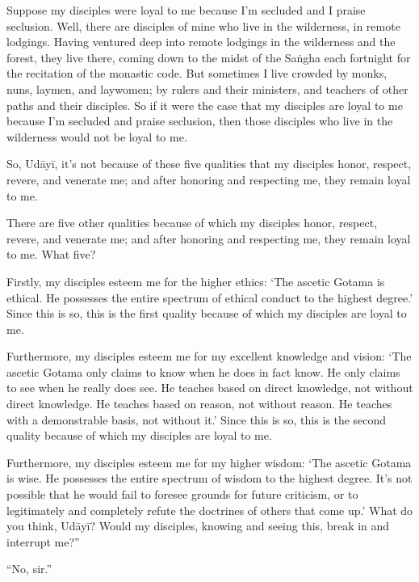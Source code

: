 \documentclass[12pt,openany]{book}%
\begin{document}
Suppose my disciples were loyal to me because I’m secluded and I praise seclusion. Well, there are disciples of mine who live in the wilderness, in remote lodgings. Having ventured deep into remote lodgings in the wilderness and the forest, they live there, coming down to the midst of the \textsanskrit{Saṅgha} each fortnight for the recitation of the monastic code. But sometimes I live crowded by monks, nuns, laymen, and laywomen; by rulers and their ministers, and teachers of other paths and their disciples. So if it were the case that my disciples are loyal to me because I’m secluded and praise seclusion, then those disciples who live in the wilderness would not be loyal to me. 

So, \textsanskrit{Udāyī}, it’s not because of these five qualities that my disciples honor, respect, revere, and venerate me; and after honoring and respecting me, they remain loyal to me. 

There are five other qualities because of which my disciples honor, respect, revere, and venerate me; and after honoring and respecting me, they remain loyal to me. What five? 

Firstly, my disciples esteem me for the higher ethics: ‘The ascetic Gotama is ethical. He possesses the entire spectrum of ethical conduct to the highest degree.’ Since this is so, this is the first quality because of which my disciples are loyal to me. 

Furthermore, my disciples esteem me for my excellent knowledge and vision: ‘The ascetic Gotama only claims to know when he does in fact know. He only claims to see when he really does see. He teaches based on direct knowledge, not without direct knowledge. He teaches based on reason, not without reason. He teaches with a demonstrable basis, not without it.’ Since this is so, this is the second quality because of which my disciples are loyal to me. 

Furthermore, my disciples esteem me for my higher wisdom: ‘The ascetic Gotama is wise. He possesses the entire spectrum of wisdom to the highest degree. It’s not possible that he would fail to foresee grounds for future criticism, or to legitimately and completely refute the doctrines of others that come up.’ What do you think, \textsanskrit{Udāyī}? Would my disciples, knowing and seeing this, break in and interrupt me?” 

“No, sir.” 
\end{document}
